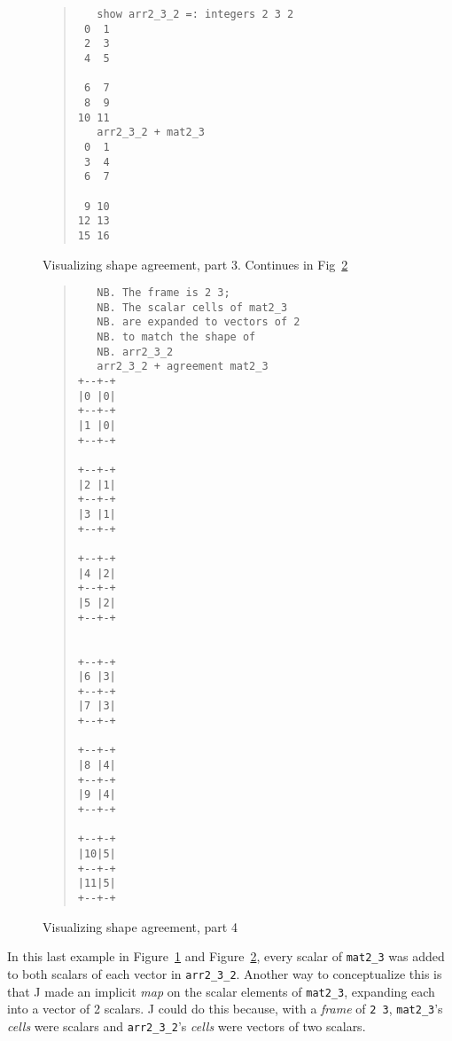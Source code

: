 %
\pagebreak
%
\begin{figure}[hp]
\begin{quote}
\begin{singlespacing}
\begin{small}
\begin{verbatim}
   show arr2_3_2 =: integers 2 3 2
 0  1
 2  3
 4  5

 6  7
 8  9
10 11
   arr2_3_2 + mat2_3
 0  1
 3  4
 6  7

 9 10
12 13
15 16
\end{verbatim}
\end{small}
\end{singlespacing}
\end{quote}
\caption{Visualizing shape agreement, part 3.
Continues in Fig~\ref{fig:agree4}}
\label{fig:agree3}
\end{figure}
%
\begin{figure}[hp]
\begin{quote}
\begin{singlespacing}
\begin{small}
\begin{verbatim}
   NB. The frame is 2 3;
   NB. The scalar cells of mat2_3
   NB. are expanded to vectors of 2
   NB. to match the shape of
   NB. arr2_3_2
   arr2_3_2 + agreement mat2_3
+--+-+
|0 |0|
+--+-+
|1 |0|
+--+-+

+--+-+
|2 |1|
+--+-+
|3 |1|
+--+-+

+--+-+
|4 |2|
+--+-+
|5 |2|
+--+-+


+--+-+
|6 |3|
+--+-+
|7 |3|
+--+-+

+--+-+
|8 |4|
+--+-+
|9 |4|
+--+-+

+--+-+
|10|5|
+--+-+
|11|5|
+--+-+
\end{verbatim}
\end{small}
\end{singlespacing}
\end{quote}
\caption{Visualizing shape agreement, part 4}
\label{fig:agree4}
\end{figure}

\noindent In this last example in Figure~\ref{fig:agree3} and Figure~\ref{fig:agree4}, 
every scalar of \texttt{mat2\_3} was added to both scalars of each vector in \texttt{arr2\_3\_2}. 
Another way to conceptualize this is that J made an implicit \textit{map} on the scalar elements of \texttt{mat2\_3}, 
expanding each into a vector of 2 scalars.
J could do this because, with a \textit{frame} of \texttt{2 3}, \texttt{mat2\_3}'s \textit{cells} were scalars and 
\texttt{arr2\_3\_2}'s \textit{cells} were vectors of two scalars.

